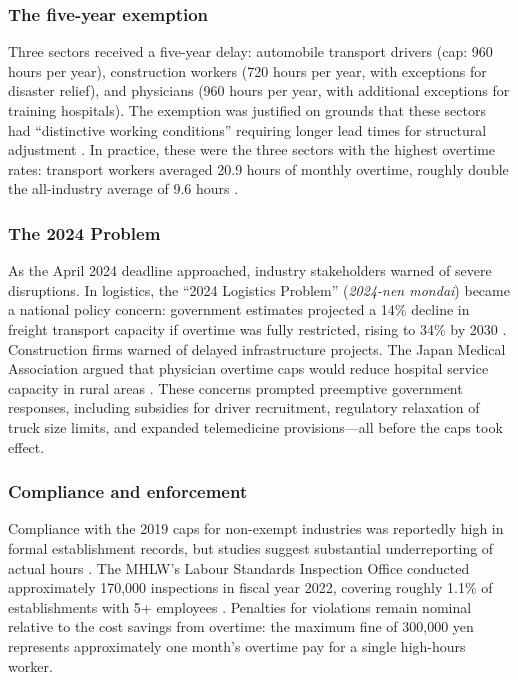 \documentclass[12pt]{article}
\begin{document}
\subsubsection*{The five-year exemption} Three sectors received a five-year delay: automobile transport drivers (cap: 960 hours per year), construction workers (720 hours per year, with exceptions for disaster relief), and physicians (960 hours per year, with additional exceptions for training hospitals). The exemption was justified on grounds that these sectors had ``distinctive working conditions'' requiring longer lead times for structural adjustment \citep{kantei2018}. In practice, these were the three sectors with the highest overtime rates: transport workers averaged 20.9 hours of monthly overtime, roughly double the all-industry average of 9.6 hours \citep{mhlw_labour2024}.

\subsubsection*{The 2024 Problem} As the April 2024 deadline approached, industry stakeholders warned of severe disruptions. In logistics, the ``2024 Logistics Problem'' (\textit{2024-nen mondai}) became a national policy concern: government estimates projected a 14\% decline in freight transport capacity if overtime was fully restricted, rising to 34\% by 2030 \citep{mlit2023}. Construction firms warned of delayed infrastructure projects. The Japan Medical Association argued that physician overtime caps would reduce hospital service capacity in rural areas \citep{jma2023}. These concerns prompted preemptive government responses, including subsidies for driver recruitment, regulatory relaxation of truck size limits, and expanded telemedicine provisions---all before the caps took effect.

\subsubsection*{Compliance and enforcement} Compliance with the 2019 caps for non-exempt industries was reportedly high in formal establishment records, but studies suggest substantial underreporting of actual hours \citep{kuroda2008}. The MHLW's Labour Standards Inspection Office conducted approximately 170,000 inspections in fiscal year 2022, covering roughly 1.1\% of establishments with 5+ employees \citep{mhlw_report2024}. Penalties for violations remain nominal relative to the cost savings from overtime: the maximum fine of 300,000 yen represents approximately one month's overtime pay for a single high-hours worker.
\end{document}

